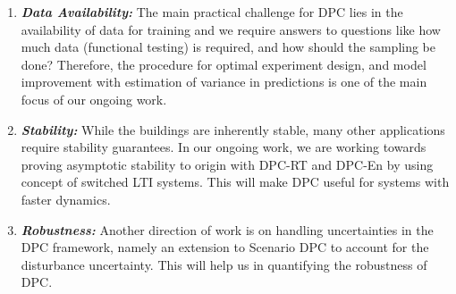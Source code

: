 \begin{enumerate}
\item \emph{\textbf{Data Availability:}} The main practical challenge for DPC lies in the availability of data for training and we require answers to questions like how much data (functional testing) is required, and how should the sampling be done? Therefore, the procedure for optimal experiment design, and model improvement with estimation of variance in predictions is one of the main focus of our ongoing work.
\item \emph{\textbf{Stability:}} While the buildings are inherently stable, many other applications require stability guarantees. In our ongoing work, we are working towards proving asymptotic stability to origin with DPC-RT and DPC-En by using concept of switched LTI systems. This will make DPC useful for systems with faster dynamics.
\item \emph{\textbf{Robustness:}} Another direction of work is on handling uncertainties in the DPC framework, namely an extension to Scenario DPC to account for the disturbance uncertainty. This will help us in quantifying the robustness of DPC.
\end{enumerate}